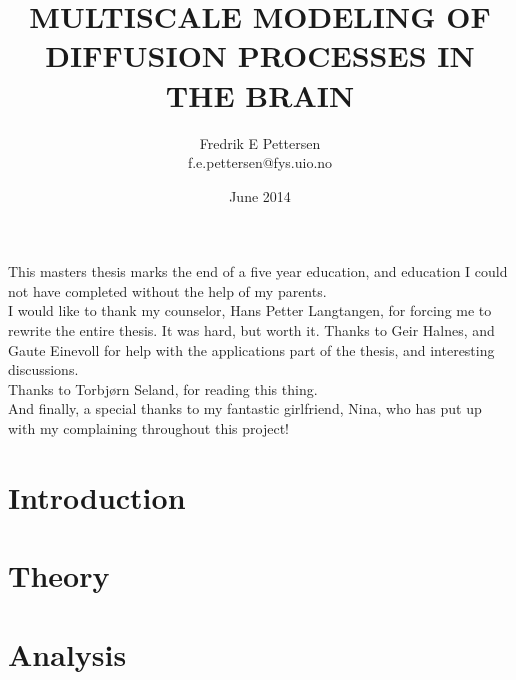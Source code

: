 \documentclass[twoside,english]{uiofysmaster}
\author{Fredrik E Pettersen\\ f.e.pettersen@fys.uio.no}
\title{\uppercase{Multiscale modeling of diffusion processes in the brain}}
\date{June 2014}
\begin{document}

\cleardoublepage



\begin{acknowledgements}
  This masters thesis marks the end of a five year education, and education I could not have completed without the help of my parents.\\
  
  \noindent I would like to thank my counselor, Hans Petter Langtangen, for forcing me to rewrite the entire thesis. It was hard, but worth it. 
  Thanks to Geir Halnes, and Gaute Einevoll for help with the applications part of the thesis, and interesting discussions. \\
  
  Thanks to Torbjørn Seland, for reading this thing.\\
  
  And finally, a special thanks to my fantastic girlfriend, Nina, who has put up with my complaining throughout this project!
  
\end{acknowledgements}


\tableofcontents
\clearpage
\listoffigures

\clearpage
\printnomenclature


\chapter{Introduction}\label{chapter:introduction}
\clearpage


\chapter{Theory}\label{chapter:theory}
\clearpage


\chapter{Analysis}\label{chapter:analysis}
\clearpage

\end{document}
